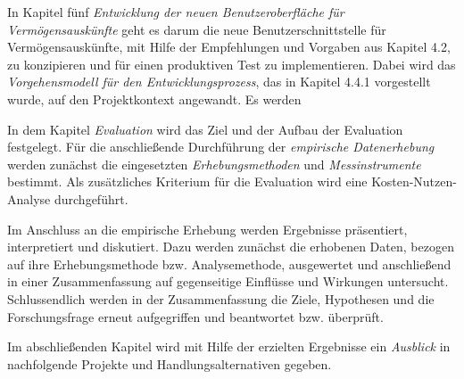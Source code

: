 In Kapitel fünf \textit{Entwicklung der neuen Benutzeroberfläche für Vermögensauskünfte} geht es darum die neue Benutzerschnittstelle für Vermögensauskünfte, mit Hilfe der Empfehlungen und Vorgaben aus Kapitel 4.2, zu konzipieren und für einen produktiven Test zu implementieren. Dabei wird das \textit{Vorgehensmodell für den Entwicklungsprozess}, das in Kapitel 4.4.1 vorgestellt wurde, auf den Projektkontext angewandt. Es werden 

In dem Kapitel \textit{Evaluation} wird das Ziel und der Aufbau der Evaluation festgelegt. Für die anschließende Durchführung der \textit{empirische Datenerhebung} werden zunächst die eingesetzten \textit{Erhebungsmethoden} und \textit{Messinstrumente} bestimmt. Als zusätzliches Kriterium für die Evaluation wird eine Kosten-Nutzen-Analyse durchgeführt.

Im Anschluss an die empirische Erhebung werden Ergebnisse präsentiert, interpretiert und diskutiert. Dazu werden zunächst die erhobenen Daten, bezogen auf ihre Erhebungsmethode bzw. Analysemethode, ausgewertet und anschließend in einer Zusammenfassung auf gegenseitige Einflüsse und Wirkungen untersucht. Schlussendlich werden in der Zusammenfassung die Ziele, Hypothesen und die Forschungsfrage erneut aufgegriffen und beantwortet bzw. überprüft.

Im abschließenden Kapitel wird mit Hilfe der erzielten Ergebnisse ein \textit{Ausblick} in nachfolgende Projekte und Handlungsalternativen gegeben.



